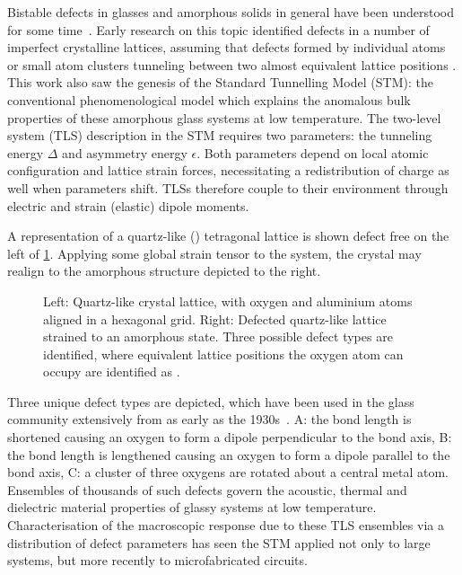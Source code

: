 Bistable defects in glasses and amorphous solids in general have been understood for some time~\cite{Zachariasen1932,Anderson1972}.
Early research on this topic identified defects in a number of imperfect crystalline lattices, assuming that defects formed by individual atoms or small atom clusters tunneling between two almost equivalent lattice positions \cite{Anderson1972,Phillips1972}.
This work also saw the genesis of the Standard Tunnelling Model (STM): the conventional phenomenological  model which explains the anomalous bulk properties of these amorphous glass systems at low temperature.
The two-level system (TLS) description in the STM requires two parameters: the tunneling energy $\Delta$ and asymmetry energy $\epsilon$.
Both parameters depend on local atomic configuration and lattice strain forces, necessitating a redistribution of charge as well when parameters shift.
TLSs therefore couple to their environment through electric and strain (elastic) dipole moments.

A representation of a quartz-like () tetragonal lattice is shown defect free on the left of \cref{fig:sio2}.
Applying some global strain tensor to the system, the crystal may realign to the amorphous structure depicted to the right.
\begin{figure}[htp]
\widefiguremargins
\begin{adjustwidth}{\leftwidth}{\rightwidth}
\resizebox{\widefigure}{!}{}
\caption[Quartz-like Crystal Lattice, Pure and Defected]{\label{fig:sio2}Left: Quartz-like crystal lattice, with oxygen \resizebox{!}{0.6em}{} and aluminium \resizebox{!}{0.6em}{} atoms aligned in a hexagonal grid. Right: Defected quartz-like lattice strained to an amorphous state. Three possible defect types are identified, where equivalent lattice positions the oxygen atom can occupy are identified as \resizebox{!}{0.6em}{}.}
\end{adjustwidth}
\end{figure}

Three unique defect types are depicted, which have been used in the glass community extensively from as early as the 1930s~\cite{Zachariasen1932}.
A: the bond length is shortened causing an oxygen to form a dipole perpendicular to the bond axis, B: the bond length is lengthened causing an oxygen to form a dipole parallel to the bond axis, C: a cluster of three oxygens are rotated about a central metal atom.
Ensembles of thousands of such defects govern the acoustic, thermal and dielectric material properties of glassy systems at low temperature.
Characterisation of the macroscopic response due to these TLS ensembles via a distribution of defect parameters \cite{Enss2005} has seen the STM applied not only to large systems, but more recently to microfabricated circuits.


